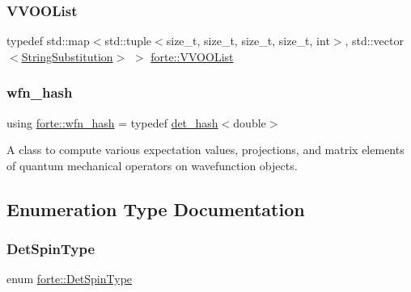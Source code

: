 \subsubsection{\texorpdfstring{V\+V\+O\+O\+List}{VVOOList}}
{\footnotesize\ttfamily typedef std\+::map$<$std\+::tuple$<$size\+\_\+t, size\+\_\+t, size\+\_\+t, size\+\_\+t, int$>$, std\+::vector$<$\mbox{\hyperlink{structforte_1_1_string_substitution}{String\+Substitution}}$>$ $>$ \mbox{\hyperlink{namespaceforte_a2554bbadd74253084e41d64216f6da95}{forte\+::\+V\+V\+O\+O\+List}}}

\mbox{\label{namespaceforte_a3246784b716a22429c59b8dc326449e3}} 
\subsubsection{\texorpdfstring{wfn\+\_\+hash}{wfn\_hash}}
{\footnotesize\ttfamily using \mbox{\hyperlink{namespaceforte_a3246784b716a22429c59b8dc326449e3}{forte\+::wfn\+\_\+hash}} = typedef \mbox{\hyperlink{namespaceforte_a47c4b5da48301071e46f500b6a674d7b}{det\+\_\+hash}}$<$double$>$}



A class to compute various expectation values, projections, and matrix elements of quantum mechanical operators on wavefunction objects. 



\subsection{Enumeration Type Documentation}
\mbox{\label{namespaceforte_acb88fa63430aae4a1b15c7be9c55f179}} 
\subsubsection{\texorpdfstring{Det\+Spin\+Type}{DetSpinType}}
{\footnotesize\ttfamily enum \mbox{\hyperlink{namespaceforte_acb88fa63430aae4a1b15c7be9c55f179}{forte\+::\+Det\+Spin\+Type}}\hspace{0.3cm}{\ttfamily [strong]}}

